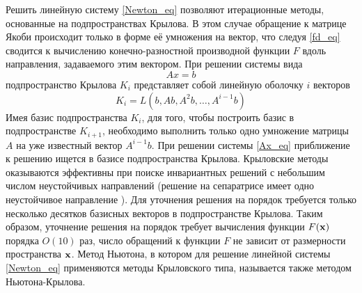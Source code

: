 Решить линейную систему \eqref{Newton_eq} позволяют итерационные методы, основанные на подпространствах Крылова. В этом случае обращение к матрице Якоби происходит только в форме её умножения на вектор, что следуя \eqref{fd_eq} сводится к вычислению конечно-разностной производной функции $F$ вдоль направления, задаваемого этим вектором. При решении системы вида 
\begin{equation}\label{Ax_eq}
Ax = b
\end{equation}
подпространство Крылова $K_i$ представляет собой линейную оболочку $i$ векторов
$$
K_i = L(b, Ab, A^2b, \dots, A^{i-1}b)
$$ 
Имея базис подпространства $K_i$, для того, чтобы построить базис в подпространстве $K_{i+1}$, необходимо выполнить только одно умножение матрицы $A$ на уже известный вектор $A^{i-1}b$. При решении системы \eqref{Ax_eq} приближение к решению ищется в базисе подпространства Крылова. Крыловские методы оказываются эффективны при поиске инвариантных решений с небольшим числом неустойчивых направлений (решение на сепаратрисе имеет одно неустойчивое направление \cite{}). Для уточнения решения на порядок требуется только несколько десятков базисных векторов в подпространстве Крылова. Таким образом, уточнение решения на порядок требует вычисления функции $F(\mathbf{x})$ порядка $O(10)$ раз, число обращений к функции $F$ не зависит от размерности пространства $\mathbf{x}$. Метод Ньютона, в котором для решение линейной системы \eqref{Newton_eq} применяются методы Крыловского типа, называется также методом Ньютона-Крылова. 


